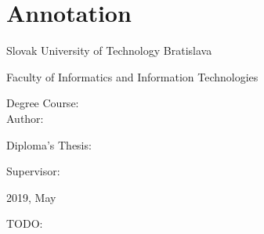 
\thispagestyle{empty}

\section*{Annotation}

\begin{minipage}[t]{1\columnwidth}%
Slovak University of Technology Bratislava 

Faculty of Informatics and Information Technologies

Degree Course: \myStudyProgramEng\\

Author: \myName

Diploma's Thesis: \myTitleEng

Supervisor: \mySupervisorEng

2019, May
\end{minipage}

\bigskip{}

TODO:

\newpage
\thispagestyle{empty}
\mbox{}
\newpage